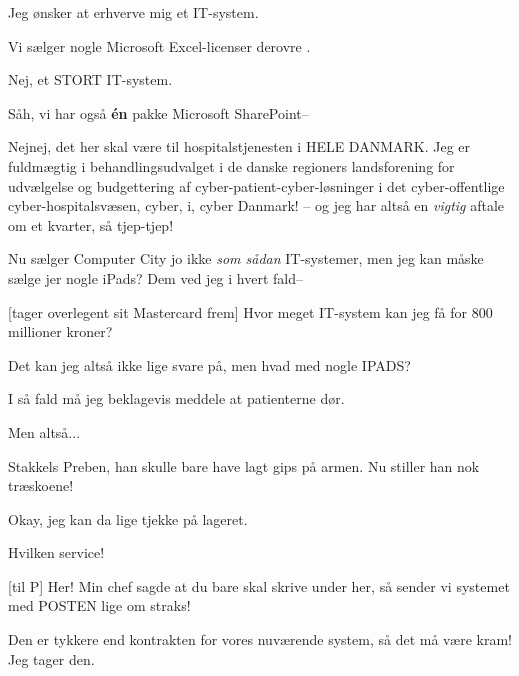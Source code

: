 \documentclass[a4paper,11pt]{article}
\begin{document}
\begin{sketch}
 Jeg ønsker at erhverve mig et IT-system.

 Vi sælger nogle Microsoft Excel-licenser derovre .

 Nej, et STORT IT-system.

 Såh, vi har også \textbf{én} pakke Microsoft SharePoint--

 Nejnej, det her skal være til hospitalstjenesten i HELE DANMARK.  Jeg
er fuldmægtig i behandlingsudvalget i de danske regioners landsforening for
udvælgelse og budgettering af cyber-patient-cyber-løsninger i det
cyber-offentlige cyber-hospitalsvæsen, cyber, i, cyber  Danmark! --
og jeg har altså en \emph{vigtig} aftale om et kvarter, så tjep-tjep! 


 Nu sælger Computer City jo ikke \emph{som sådan} IT-systemer, men jeg
kan måske sælge jer nogle iPads?  Dem ved jeg i hvert fald-- 

[tager overlegent sit Mastercard frem] Hvor meget IT-system kan jeg få
for 800 millioner kroner?

 Det kan jeg altså ikke lige svare på, men hvad med nogle IPADS?


 I så fald må jeg beklagevis meddele at patienterne dør.

 Men altså...

 Stakkels Preben, han skulle bare have lagt gips på armen.  Nu stiller
han nok træskoene!

 Okay, jeg kan da lige tjekke på lageret.


 Hvilken service!



[til P] Her!  Min chef sagde at du bare skal skrive under her, så sender
vi systemet med POSTEN lige om straks!


 Den er tykkere end kontrakten for vores nuværende system, så det må
være kram!  Jeg tager den.



\end{sketch}
\end{document}
